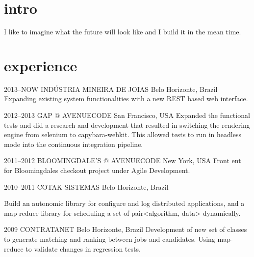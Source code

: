 \documentclass[]{friggeri-cv}
\begin{document}
\section{intro}

I like to imagine what the future will look like and I build it in the mean time.

\section{experience}
\begin{entrylist}


\entry
{2013--NOW}
{INDÚSTRIA MINEIRA DE JOIAS}
{Belo Horizonte, Brazil}
{ Expanding existing system functionalities with a new REST based web interface.}


\entry
{2012--2013}
{GAP @ AVENUECODE}
{San Francisco, USA}
{ Expanded the functional tests and did a research and development that resulted in switching the rendering engine from selenium to capybara-webkit. This allowed tests to run in  headless mode into the continuous integration pipeline.
}


\entry
{2011--2012}
{BLOOMINGDALE'S @ AVENUECODE}
{New York, USA}
{ Front ent for Bloomingdales checkout project under Agile Development. 
}

\entry
{2010--2011}
{COTAK SISTEMAS}
{Belo Horizonte, Brazil}
{ Build an autonomic library for configure and log distributed applications, and a map reduce library for scheduling a set of pair<algorithm, data> dynamically. 

% 
}

\entry
{2009}
{CONTRATANET}
{Belo Horizonte, Brazil}
{ Development of new set of classes to generate matching and ranking between jobs and candidates. Using map-reduce to validate changes in regression tests. }


\end{entrylist}
\end{document}
